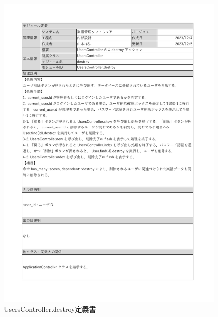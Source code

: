 \begin{figure}
    \centering
    \includegraphics[scale=0.7]{img/Users/xlsx/UsersController_destroy.pdf}
    \vspace{-1cm}
    \caption{UsersController.destroy定義書}
\end{figure}
